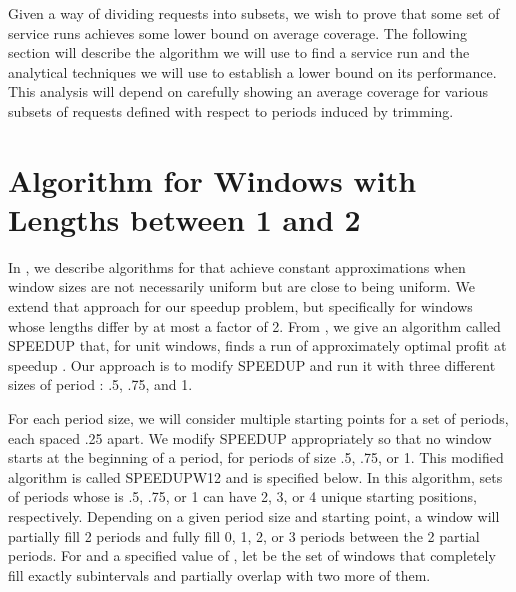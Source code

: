 \documentclass[11pt]{article}
\begin{document}
Given a way of dividing requests into subsets, we wish to prove that some set of service runs achieves some lower bound on average coverage.  The following section will describe the algorithm we will use to find a service run and the analytical techniques we will use to establish a lower bound on its performance.  This analysis will depend on carefully showing an average coverage for various subsets of requests defined with respect to periods induced by trimming. 


\section{Algorithm for Windows with Lengths between 1 and 2}
\label{section:lengths12}

In \cite{Frederickson6}, we describe algorithms for  that achieve constant approximations when window sizes are not necessarily uniform
but are close to being uniform.
We extend that approach for our speedup problem,
but specifically for windows whose lengths differ by at most a factor of 2.  From \cite{Frederickson5}, we give an algorithm called SPEEDUP that, for unit windows, finds a run of approximately optimal profit at speedup .
Our approach is to modify SPEEDUP  and run it with three different sizes of period : .5, .75, and 1.

For each period size, we will consider multiple starting points for a set of periods, each spaced .25 apart.  
We modify SPEEDUP appropriately so that no window starts at the beginning of a period, for periods of size .5, .75, or 1.  This modified algorithm is called SPEEDUPW12 and is specified below.
In this algorithm, sets of periods whose  is .5, .75, or 1 can have 2, 3, or 4 unique starting positions, respectively.  
Depending on a given period size  and starting point, a window will partially fill 2 periods 
and fully fill 0, 1, 2, or 3 periods between the 2 partial periods.  For  and a specified value of , let  be the set of windows
that completely fill exactly  subintervals and partially overlap with two more of them.
\end{document}
